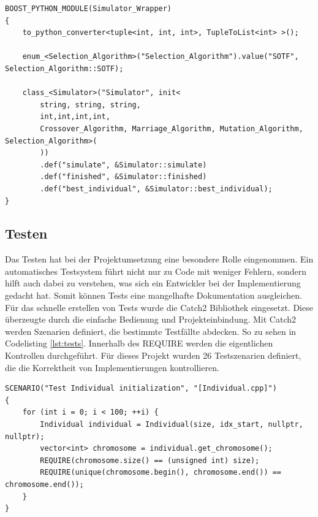 \begin{minipage}{\linewidth}
\begin{lstlisting}[caption={C++ zu Python Schnittstelle}, firstnumber=1, captionpos=b, label=lst:boostpython]
BOOST_PYTHON_MODULE(Simulator_Wrapper)
{
	to_python_converter<tuple<int, int, int>, TupleToList<int> >();

	enum_<Selection_Algorithm>("Selection_Algorithm").value("SOTF", Selection_Algorithm::SOTF);

	class_<Simulator>("Simulator", init<
		string, string, string,
		int,int,int,int,
		Crossover_Algorithm, Marriage_Algorithm, Mutation_Algorithm, Selection_Algorithm>(
		))
 		.def("simulate", &Simulator::simulate)
		.def("finished", &Simulator::finished)
		.def("best_individual", &Simulator::best_individual);
}
\end{lstlisting}
\end{minipage}
\subsection{Testen}
Das Testen hat bei der Projektumsetzung eine besondere Rolle eingenommen. Ein automatisches Testsystem führt nicht nur zu Code mit weniger Fehlern, sondern hilft auch dabei zu verstehen, was sich ein Entwickler bei der Implementierung gedacht hat. Somit können Tests eine mangelhafte Dokumentation ausgleichen.\\
Für das schnelle erstellen von Tests wurde die Catch2 Bibliothek eingesetzt. Diese überzeugte durch die einfache Bedienung und Projekteinbindung.
Mit Catch2 werden Szenarien definiert, die bestimmte Testfällte abdecken. So zu sehen in Codelisting \ref{lst:tests}. Innerhalb des REQUIRE werden die eigentlichen Kontrollen durchgeführt.
Für dieses Projekt wurden 26 Testszenarien definiert, die die Korrektheit von Implementierungen kontrollieren.
\begin{minipage}{\linewidth}
\begin{lstlisting}[caption={Unit-Tests}, firstnumber=1, captionpos=b, label=lst:tests]
SCENARIO("Test Individual initialization", "[Individual.cpp]")
{
	for (int i = 0; i < 100; ++i) {
		Individual individual = Individual(size, idx_start, nullptr, nullptr);
		vector<int> chromosome = individual.get_chromosome();
		REQUIRE(chromosome.size() == (unsigned int) size);
		REQUIRE(unique(chromosome.begin(), chromosome.end()) == chromosome.end());
	}
}
\end{lstlisting}
\end{minipage}
